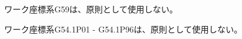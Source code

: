 ワーク座標系{\ttfamily G59}は、原則として使用しない。



ワーク座標系{\ttfamily G54.1\;P01} - {\ttfamily G54.1\;P96}は、原則として使用しない。



